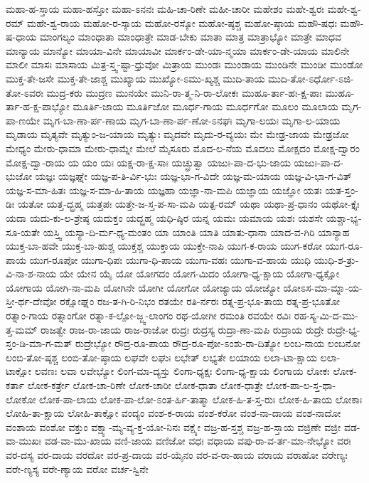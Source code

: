 {ಮಹಾ-ಹ-ಸ್ತಾಯ
ಮಹಾ-ಹಸ್ತೋ
ಮಹಾ-ಽನನಃ
ಮಹಿ-ಚಾ-ರಿಣೇ
ಮಹೀ-ಚಾರೀ
ಮಹೇಶಂ
ಮಹೇ-ಶ್ವರಃ
ಮಹೇ-ಶ್ವ-ರಮ್
ಮಹೇ-ಶ್ವ-ರಾಯ
ಮಹೋ-ರ-ಸ್ಕಾಯ
ಮಹೋ-ರಸ್ಕೋ
ಮಹೋ-ಷ್ಠಶ್ಚ
ಮಹೋ-ಷ್ಠಾಯ
ಮಹೌ-ಷಧಃ
ಮಹೌ-ಷ-ಧಾಯ
ಮಾಂಗಲ್ಯಂ
ಮಾಂಧಾತಾ
ಮಾಂಧಾತ್ರೇ
ಮಾಡ-ಬೇಕು
ಮಾತಾ
ಮಾತ್ರ
ಮಾತ್ರಾಭ್ಯೋ
ಮಾತ್ರೇ
ಮಾಧವ
ಮಾನ್ಯಾಯ
ಮಾನ್ಯೋ
ಮಾಯಾ-ವಿನೇ
ಮಾಯಾವೀ
ಮಾರ್ಕಂ-ಡೇ-ಯಾ-ನ್ಮಯಾ
ಮಾರ್ಕಂ-ಡೇ-ಯಾಯ
ಮಾಲಿನೇ
ಮಾಲೀ
ಮಾಸಃ
ಮಾಸಾಯ
ಮಿತ್ರ-ಸ್ತ್ವ-ಷ್ಟಾ-ಧ್ರುವೋ
ಮಿತ್ರಾಯ
ಮುಂಡಃ
ಮುಂಡಾಯ
ಮುಂಡಿನೇ
ಮುಂಡೀ
ಮುಂಡೋ
ಮುಕ್ತ-ತೇ-ಜಸೇ
ಮುಕ್ತ-ತೇ-ಜಾಶ್ಚ
ಮುಖ್ಯಾಯ
ಮುಖ್ಯೋ-ಽಮು-ಖ್ಯಶ್ಚ
ಮುದಿ-ತಾಯ
ಮುದಿ-ತೋ-ಽರ್ಧೋ-ಽಜಿ-ತೋ-ಽವರಃ
ಮುದ್ರ-ಕರು
ಮುದ್ರಣ
ಮುನಯೇ
ಮುನಿ-ರಾ-ತ್ಮ-ನಿ-ರಾ-ಲೋಕಃ
ಮುಹೂ-ರ್ತಾ-ಹಃ-ಕ್ಷ-ಪಾಃ
ಮುಹೂ-ರ್ತಾ-ಹ-ಕ್ಷ-ಪಾಭ್ಯೋ
ಮೂರ್ತಿ-ಜಾಯ
ಮೂರ್ತಿಜೋ
ಮೂರ್ಧ-ಗಾಯ
ಮೂರ್ಧಗೋ
ಮೂಲಂ
ಮೂಲಾಯ
ಮೃಗ-ಪಾ-ಣಯೇ
ಮೃಗ-ಬಾ-ಣಾ-ರ್ಪ-ಣಾಯ
ಮೃಗ-ಬಾ-ಣಾ-ರ್ಪ-ಣೋ-ಽನಘಃ
ಮೃಗಾ-ಲಯಃ
ಮೃಗಾ-ಲ-ಯಾಯ
ಮೃಡಾಯ
ಮೃತ್ಯವೇ
ಮೃತ್ಯುಂ-ಜ-ಯಾಯ
ಮೃತ್ಯುಃ
ಮೃದವೇ
ಮೃದು-ರ-ವ್ಯಯಃ
ಮೇ
ಮೇಢ್ರ-ಜಾಯ
ಮೇಢ್ರಜೋ
ಮೇಧ್ಯಂ
ಮೇರು-ಧಾಮಾ
ಮೇರು-ಧಾಮ್ನೇ
ಮೇಲೆ
ಮೈಸೂರು
ಮೊದ-ಲ-ನೆಯ
ಮೊದಲು
ಮೋಕ್ಷದಂ
ಮೋಕ್ಷ-ದ್ವಾರಂ
ಮೋಕ್ಷ-ದ್ವಾ-ರಾಯ
ಯ
ಯಂ
ಯಃ
ಯಕ್ಷ-ರಾ-ಕ್ಷ-ಸಾಃ
ಯಚ್ಛ್ರುತ್ವಾ
ಯಜುಃ-ಪಾ-ದ-ಭು-ಜಾಯ
ಯಜುಃ-ಪಾ-ದ-ಭುಜೋ
ಯಜ್ಞಃ
ಯಜ್ಞಘ್ನೇ
ಯಜ್ಞ-ಪ-ತಿ-ರ್ವಿ-ಭುಃ
ಯಜ್ಞ-ಭಾ-ಗ-ವಿದೇ
ಯಜ್ಞ-ಮ-ಯಾಯ
ಯಜ್ಞ-ವಿ-ಭಾ-ಗ-ವಿತ್
ಯಜ್ಞ-ಸ-ಮಾ-ಹಿತಃ
ಯಜ್ಞ-ಸ-ಮಾ-ಹಿ-ತಾಯ
ಯಜ್ಞಹಾ
ಯಜ್ಞಾ-ನಾ-ಮಪಿ
ಯಜ್ಞಾಯ
ಯಜ್ಞೋ
ಯತಃ
ಯತ-ಸ್ತಂ-ಡಿಃ
ಯತೋ
ಯತ್ತ-ದ್ಬ್ರಹ್ಮ
ಯತ್ತಪಃ
ಯತ್ತೇ-ಜ-ಸ್ತ-ಪ-ಸಾ-ಮಪಿ
ಯತ್ಪ-ರಮ್
ಯಥಾ
ಯಥಾ-ಪ್ರ-ಧಾನಂ
ಯಥೋ-ಕ್ತೈಃ
ಯದಾ
ಯದು-ಕು-ಲ-ಶ್ರೇಷ್ಠ
ಯದುಕ್ತಂ
ಯದ್ಬ್ರಹ್ಮ
ಯಧಿ-ಷ್ಠಿರ
ಯನ್ನ
ಯಮಃ
ಯಮಾಯ
ಯಶಃ
ಯಶಸೇ
ಯಶ್ಚಾ-ಭ್ಯ-ಸೂ-ಯತೇ
ಯಸ್ತ್ವಿ
ಯಸ್ಯಾ-ದಿ-ರ್ಮ-ಧ್ಯ-ಮಂತಂ
ಯಾ
ಯಾಂತಿ
ಯಾತಿ
ಯಾತು-ಧಾನಾ
ಯಾದ-ವ-ಗಿರಿ
ಯಾನ್ಯಾಹ
ಯುಕ್ತ-ಬಾ-ಹವೇ
ಯುಕ್ತ-ಬಾ-ಹುಶ್ಚ
ಯುಕ್ತಶ್ಚ
ಯುಕ್ತಾಯ
ಯುಕ್ತೇ-ನಾಪಿ
ಯುಗ-ಕ-ರಾಯ
ಯುಗ-ಕರೋ
ಯುಗ-ರೂ-ಪಾಯ
ಯುಗ-ರೂಪೋ
ಯುಗಾ-ಧಿಪಃ
ಯುಗಾ-ಧಿ-ಪಾಯ
ಯುಗಾ-ವಹಃ
ಯುಗಾ-ವ-ಹಾಯ
ಯುಧಿ
ಯುಧಿ-ಶ-ತ್ರು-ವಿ-ನಾ-ಶ-ನಾಯ
ಯೇ
ಯೇನ
ಯೈ
ಯೋ
ಯೋಗದಂ
ಯೋಗ-ಮಿದಂ
ಯೋಗಾ-ಧ್ಯ-ಕ್ಷಾಯ
ಯೋಗಾ-ಧ್ಯಕ್ಷೋ
ಯೋಗಾಯ
ಯೋಗಿ-ನಾ-ಮಪಿ
ಯೋಗಿನೇ
ಯೋಗೀ
ಯೋಗೋ
ಯೋಜ್ಯಾಯ
ಯೋಜ್ಯೋ
ಯೋಽಸ-ಮಾ-ಮ್ನಾ-ಯ-ಸ್ತೀ-ರ್ಥ-ದೇವೋ
ರಕ್ಷೋಘ್ನಂ
ರಜ-ತ-ಗಿ-ರಿ-ನಿಭಂ
ರತಯೇ
ರತಿ-ರ್ನರಃ
ರತ್ನ-ಪ್ರ-ಭೂ-ತಾಯ
ರತ್ನ-ಪ್ರ-ಭೂತೋ
ರತ್ನಾಂ-ಗಾಯ
ರತ್ನಾಂಗೋ
ರತ್ನಾ-ಕ-ಲ್ಪೋ-ಜ್ಜ್ವ-ಲಾಂಗಂ
ರಥ-ಯೋಗೀ
ರಮಂತಿ
ರವಯೇ
ರವಿಃ
ರಹ-ಸ್ಯ-ಮಿ-ದ-ಮು-ತ್ತ-ಮಮ್
ರಾಜತ್ವೇ
ರಾಜ-ರಾ-ಜಾಯ
ರಾಜ-ರಾಜೋ
ರುದ್ರಃ
ರುದ್ರಸ್ಯ
ರುದ್ರಾ-ಣಾ-ಮಪಿ
ರುದ್ರಾಯ
ರುದ್ರೇ
ರುದ್ರೇ-ಭ್ಯ-ಸ್ತಂ-ಡಿ-ಮಾ-ಗ-ಮತ್
ರುದ್ರೇಭ್ಯೋ
ರೌದ್ರ-ರೂ-ಪಾಯ
ರೌದ್ರ-ರೂ-ಪೋ-ಽಂಶು-ರಾ-ದಿತ್ಯೋ
ಲಂಬ-ನಾಯ
ಲಂಬನೋ
ಲಂಬಿ-ತೋ-ಷ್ಠಶ್ಚ
ಲಂಬಿ-ತೋ-ಷ್ಠಾಯ
ಲಘವೇ
ಲಘುಃ
ಲಭೇತ್
ಲಭ್ಯತೇ
ಲಯಾಯ
ಲಲಾ-ಟಾ-ಕ್ಷಾಯ
ಲಲಾ-ಟಾಕ್ಷೋ
ಲವಣಃ
ಲವಾ
ಲವೇಭ್ಯೋ
ಲಿಂಗ-ಮಾ-ದ್ಯಸ್ತು
ಲಿಂಗಾ-ಧ್ಯಕ್ಷಃ
ಲಿಂಗಾ-ಧ್ಯ-ಕ್ಷಾಯ
ಲಿಂಗಾಯ
ಲೋಕಃ
ಲೋಕ-ಕರ್ತಾ
ಲೋಕ-ಕರ್ತ್ರೇ
ಲೋಕ-ಚಾ-ರಿಣೇ
ಲೋಕ-ಚಾರೀ
ಲೋಕ-ಧಾತಾ
ಲೋಕ-ಧಾತ್ರೇ
ಲೋಕ-ಪಾ-ಲ-ಸ್ತ-ಥಾ-ಲೋಕೋ
ಲೋಕ-ಪಾ-ಲಾಯ
ಲೋಕ-ಪಾ-ಲೋ-ಽಂತ-ರ್ಹಿ-ತಾತ್ಮಾ
ಲೋಕ-ಹಿ-ತ-ಸ್ತ-ರುಃ
ಲೋಕ-ಹಿ-ತಾಯ
ಲೋಕಾಃ
ಲೋಹಿ-ತಾ-ಕ್ಷಾಯ
ಲೋಹಿ-ತಾಕ್ಷೋ
ವಂದ್ಯಂ
ವಂಶ-ಕ-ರಾಯ
ವಂಶ-ಕರೋ
ವಂಶ-ನಾ-ದಾಯ
ವಂಶ-ನಾದೋ
ವಂಶಾಯ
ವಂಶೋ
ವಕ್ತುಂ
ವಕ್ಷ್ಯಾ-ಮ್ಯ-ವ್ಯ-ಕ್ತ-ಯೋ-ನಿನಃ
ವಕ್ಷ್ಯೇ
ವಜ್ರ-ಹ-ಸ್ತಶ್ಚ
ವಜ್ರ-ಹ-ಸ್ತಾಯ
ವಜ್ರಿಣೇ
ವಜ್ರೀ
ವಡ-ವಾ-ಮುಖಃ
ವಡ-ವಾ-ಮು-ಖಾಯ
ವಣಿ-ಜಾಯ
ವಣಿಜೋ
ವಧಃ
ವಧಾಯ
ವಪು-ರಾ-ವ-ರ್ತ-ಮಾ-ನೇಭ್ಯೋ
ವರಃ
ವರ-ದಸ್ಯ
ವರ-ದಾಯ
ವರದೋ
ವರ-ಪ್ರ-ದಾಯ
ವರ-ಯೈನಂ
ವರ-ವ-ರಾ-ಹಾಯ
ವರಾಯ
ವರಾಹೋ
ವರೇಣ್ಯಃ
ವರೇ-ಣ್ಯಸ್ಯ
ವರೇ-ಣ್ಯಾಯ
ವರೋ
ವರ್ಚ-ಸ್ವಿನೇ
}

